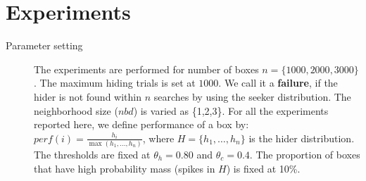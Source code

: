 \documentclass[11pt,a4paper,draft]{article}
\begin{document}
\section{Experiments} \label{base_expt}

\begin{description}
	\item[Parameter setting] The experiments are performed for number of boxes $n = \{1000, 2000, 3000\}$. The maximum hiding trials is set at $1000$. We call it a \textbf{failure}, if the hider is not found within $n$ searches by using the seeker distribution. The neighborhood size ($nbd$) is varied as \{1,2,3\}. For all the experiments reported here, we define performance of a box by: $perf(i) = \frac{h_i}{\max(h_1,\ldots, h_n)}$, where $H = \{h_1,\ldots, h_n\}$ is the hider distribution. The thresholds are fixed at $\theta_h = 0.80$ and $\theta_c = 0.4$. The proportion of boxes that have high probability mass (spikes in $H$) is fixed at 10\%.
	\label{setting:base}


\end{description}
\end{document}
